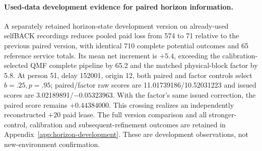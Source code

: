 \paragraph{Used-data development evidence for paired horizon information.}
A separately retained horizon-state development version on already-used
selfBACK recordings reduces pooled paid loss from 574 to 71 relative to the
previous paired version, with identical 710 complete potential outcomes
and 65 reference service totals. Its mean net increment is $+5.4$, exceeding
the calibration-selected QMF complete pipeline by 65.2 and the matched
physical-block factor by 5.8. At person 51, delay 152001, origin 12, both
paired and factor controls select$b=.25,p=.95$; paired/factor raw scores
are 11.01739186/10.52031223 and issued scores are 3.02189891/$-0.05323963$.
With the factor's same issued correction, the paired score remains
$+0.44384000$. This crossing realizes an independently reconstructed
$+20$ paid lease. The full version comparison and all stronger-control,
calibration and subsequent-refinement outcomes are retained in
Appendix~\ref{app:horizon-development}. These are development observations,
not new-environment confirmation.
